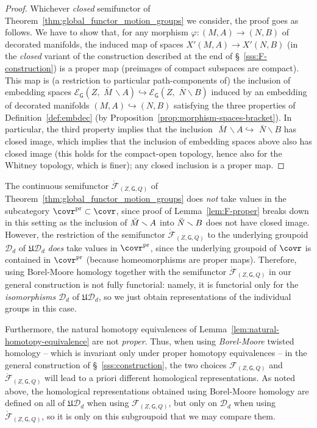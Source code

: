 \documentclass[AHL,Unicode,published]{cedram}
\newcommand{\pr}{\ensuremath{\mathrm{pr}}}
\newcommand{\Int}{\mathring}
\newcommand{\mbar}{\ensuremath{{\,\,\overline{\!\! M\!}\,}}}
\newcommand{\nbar}{\ensuremath{{\,\,\overline{\!\! N}}}}
\newcommand{\fU}{\ensuremath{\mathfrak{U}}}
\newcommand{\sG}{\mathsf{G}}
\newcommand{\cD}{\mathcal{D}}
\newcommand{\cE}{\mathcal{E}}
\newcommand{\cF}{\mathcal{F}}
\begin{document}
\begin{proof}
Whichever \emph{closed} semifunctor of Theorem~\ref{thm:global_functor_motion_groups} we consider, the proof goes as follows. We have to show that, for any morphism $\varphi \colon (M,A) \to (N,B)$ of decorated manifolds, the induced map of spaces $X'(M,A) \to X'(N,B)$ (in the \emph{closed} variant of the construction described at the end of \S~\ref{sss:F-construction}) is a proper map (preimages of compact subspaces are compact). This map is (a restriction to particular path-components of) the inclusion of embedding spaces $\cE_{\sG}(Z, \mbar \smallsetminus A) \hookrightarrow \cE_{\sG}(Z, \nbar \smallsetminus B)$ induced by an embedding of decorated manifolds $(M,A) \hookrightarrow (N,B)$ satisfying the three properties of Definition~\ref{def:embdec} (by Proposition~\ref{prop:morphism-spaces-bracket}). In particular, the third property implies that the inclusion $\mbar \smallsetminus A \hookrightarrow \nbar \smallsetminus B$ has closed image, which implies that the inclusion of embedding spaces above also has closed image (this holds for the compact-open topology, hence also for the Whitney topology, which is finer); any closed inclusion is a proper map.
\end{proof}

\begin{rema}
The continuous semifunctor $\Int{\cF}_{(Z,\sG,Q)}$ of Theorem~\ref{thm:global_functor_motion_groups} does \emph{not} take values in the subcategory $\covr^{\pr} \subset \covr$, since proof of Lemma~\ref{lem:F-proper} breaks down in this setting as the inclusion of $\Breve{M} \smallsetminus A$ into $\Breve{N} \smallsetminus B$ does not have closed image. However, the restriction of the semifunctor $\Int{\cF}_{(Z,\sG,Q)}$ to the underlying groupoid $\cD_{d}$ of $\fU\cD_{d}$ \emph{does} take values in $\covr^{\pr}$, since the underlying groupoid of $\covr$ is contained in $\covr^{\pr}$ (because homeomorphisms are proper maps). Therefore, using Borel-Moore homology together with the semifunctor $\Int{\cF}_{(Z,\sG,Q)}$ in our general construction is not fully functorial: namely, it is functorial only for the \emph{isomorphisms} $\cD_{d}$ of $\fU\cD_{d}$, so we just obtain representations of the individual groups in this case.

Furthermore, the natural homotopy equivalences of Lemma~\ref{lem:natural-homotopy-equivalence} are not \emph{proper}. Thus, when using \emph{Borel-Moore} twisted homology -- which is invariant only under proper homotopy equivalences -- in the general construction of \S~\ref{sss:construction}, the two choices $\cF_{(Z,\sG,Q)}$ and $\Int{\cF}_{(Z,\sG,Q)}$ will lead to a priori different homological representations. As noted above, the homological representations obtained using Borel-Moore homology are defined on all of $\fU\cD_{d}$ when using $\cF_{(Z,\sG,Q)}$, but only on $\cD_{d}$ when using $\Int{\cF}_{(Z,\sG,Q)}$, so it is only on this subgroupoid that we may compare them.
\end{rema}
\end{document}
